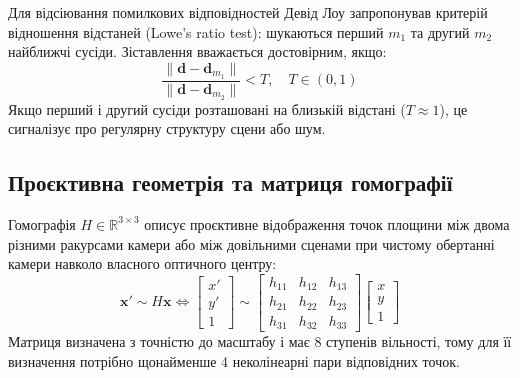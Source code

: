 \documentclass[12pt, a4paper]{article}
\begin{document}
	Для відсіювання помилкових відповідностей Девід Лоу запропонував критерій відношення відстаней (Lowe's ratio test): шукаються перший $m_1$ та другий $m_2$ найближчі сусіди. Зіставлення вважається достовірним, якщо:
	\begin{equation}
		\frac{\|\mathbf{d} - \mathbf{d}_{m_1}\|}{\|\mathbf{d} - \mathbf{d}_{m_2}\|} < T, \quad T \in (0, 1)
	\end{equation}
	Якщо перший і другий сусіди розташовані на близькій відстані ($T \approx 1$), це сигналізує про регулярну структуру сцени або шум.
	
	\subsection{Проєктивна геометрія та матриця гомографії}
	Гомографія $H \in \mathbb{R}^{3 \times 3}$ описує проєктивне відображення точок площини між двома різними ракурсами камери або між довільними сценами при чистому обертанні камери навколо власного оптичного центру:
	\begin{equation}
		\mathbf{x}' \sim H \mathbf{x} \iff \begin{bmatrix} x' \\ y' \\ 1 \end{bmatrix} \sim \begin{bmatrix} h_{11} & h_{12} & h_{13} \\ h_{21} & h_{22} & h_{23} \\ h_{31} & h_{32} & h_{33} \end{bmatrix} \begin{bmatrix} x \\ y \\ 1 \end{bmatrix}
	\end{equation}
	Матриця визначена з точністю до масштабу і має 8 ступенів вільності, тому для її визначення потрібно щонайменше 4 неколінеарні пари відповідних точок.
	
\end{document}
